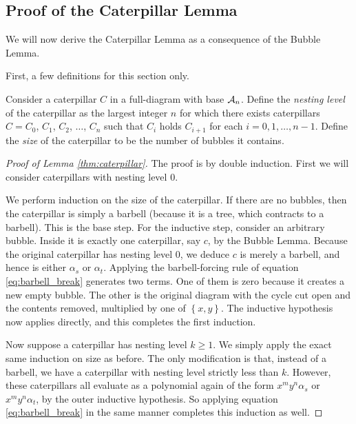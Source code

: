 \subsection{Proof of the Caterpillar Lemma}
We will now derive the Caterpillar Lemma as a consequence of the Bubble Lemma.  

First, a few definitions for this section only.
\begin{definition*}
	Consider a caterpillar $C$ in a full-diagram with base $\AA_n$.  Define the \emph{nesting level} of the caterpillar as the largest integer $n$ for which there exists caterpillars $C = C_0$, $C_1$, $C_2$, $\dots$, $C_n$ such that $C_i$ holds $C_{i+1}$ for each $i=0,1,\dots,n-1$.  Define the \emph{size} of the caterpillar to be the number of bubbles it contains.
\end{definition*}

\begin{proof}[Proof of Lemma \ref{thm:caterpillar}]
	The proof is by double induction.  First we will consider caterpillars with nesting level $0$.  

	We perform induction on the size of the caterpillar. 
	If there are no bubbles, then the caterpillar is simply a barbell (because it is a tree, which contracts to a barbell).
	This is the base step.
	For the inductive step, consider an arbitrary bubble.  Inside it is exactly one caterpillar, say $c$, by the Bubble Lemma.  Because the original caterpillar has nesting level $0$, we deduce $c$ is merely a barbell, and hence is either $\alpha_s$ or $\alpha_t$.
	Applying the barbell-forcing rule of equation \eqref{eq:barbell_break} generates two terms.  One of them is zero because it creates a new empty bubble. The other is the original diagram with the cycle cut open and the contents removed, multiplied by one of $\left\{ x,y \right\}$.  The inductive hypothesis now applies directly, and this completes the first induction.

	Now suppose a caterpillar has nesting level $k \ge 1$.  We simply apply the exact same induction on size as before.  The only modification is that, instead of a barbell, we have a caterpillar with nesting level strictly less than $k$.  However, these caterpillars all evaluate as a polynomial again of the form $x^my^n \alpha_s$ or $x^my^n\alpha_t$, by the outer inductive hypothesis.  So applying equation \eqref{eq:barbell_break} in the same manner completes this induction as well.
\end{proof}

